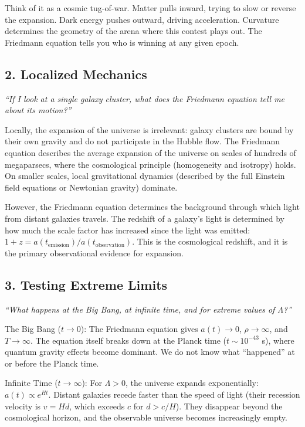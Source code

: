 \documentclass[11pt,openright]{book}
\begin{document}
Think of it as a cosmic tug-of-war. Matter pulls inward, trying to slow or reverse the expansion. Dark energy pushes outward, driving acceleration. Curvature determines the geometry of the arena where this contest plays out. The Friedmann equation tells you who is winning at any given epoch.

\subsection*{2. Localized Mechanics}
\textit{``If I look at a single galaxy cluster, what does the Friedmann equation tell me about its motion?''}

Locally, the expansion of the universe is irrelevant: galaxy clusters are bound by their own gravity and do not participate in the Hubble flow. The Friedmann equation describes the average expansion of the universe on scales of hundreds of megaparsecs, where the cosmological principle (homogeneity and isotropy) holds. On smaller scales, local gravitational dynamics (described by the full Einstein field equations or Newtonian gravity) dominate.

However, the Friedmann equation determines the background through which light from distant galaxies travels. The redshift of a galaxy's light is determined by how much the scale factor has increased since the light was emitted: $1 + z = a(t_{\text{emission}})/a(t_{\text{observation}})$. This is the cosmological redshift, and it is the primary observational evidence for expansion.

\subsection*{3. Testing Extreme Limits}
\textit{``What happens at the Big Bang, at infinite time, and for extreme values of $\Lambda$?''}

The Big Bang ($t \to 0$): The Friedmann equation gives $a(t) \to 0$, $\rho \to \infty$, and $T \to \infty$. The equation itself breaks down at the Planck time ($t \sim 10^{-43}$ s), where quantum gravity effects become dominant. We do not know what ``happened'' at or before the Planck time.

Infinite Time ($t \to \infty$): For $\Lambda > 0$, the universe expands exponentially: $a(t) \propto e^{Ht}$. Distant galaxies recede faster than the speed of light (their recession velocity is $v = H d$, which exceeds $c$ for $d > c/H$). They disappear beyond the cosmological horizon, and the observable universe becomes increasingly empty.
\end{document}
